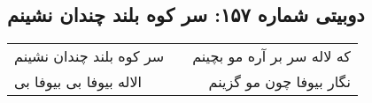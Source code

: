 \begin{center}
\section*{دوبیتی شماره ۱۵۷: سر کوه بلند چندان نشینم}
\label{sec:157}
\begin{longtable}{l p{0.5cm} r}
سر کوه بلند چندان نشینم
&&
که لاله سر بر آره مو بچینم
\\
الاله بیوفا بی بیوفا بی
&&
نگار بیوفا چون مو گزینم
\\
\end{longtable}
\end{center}
